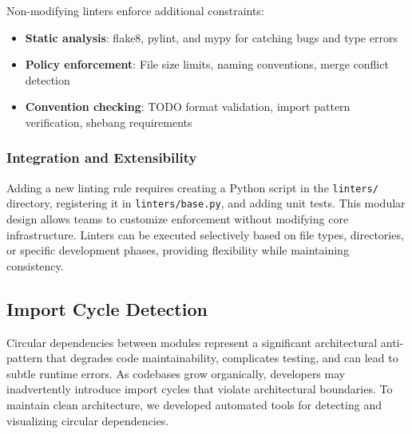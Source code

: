 Non-modifying linters enforce additional constraints:

\begin{itemize}
  \item \textbf{Static analysis}: flake8, pylint, and mypy for catching bugs
    and type errors

  \item \textbf{Policy enforcement}: File size limits, naming conventions,
    merge conflict detection

  \item \textbf{Convention checking}: TODO format validation, import
    pattern verification, shebang requirements
\end{itemize}

\subsubsection{Integration and Extensibility}
Adding a new linting rule requires creating a Python script in the
\texttt{linters/} directory, registering it in \texttt{linters/base.py}, and
adding unit tests. This modular design allows teams to customize enforcement
without modifying core infrastructure. Linters can be executed selectively
based on file types, directories, or specific development phases, providing
flexibility while maintaining consistency.

\subsection{Import Cycle Detection}
Circular dependencies between modules represent a significant
architectural anti-pattern that degrades code maintainability, complicates
testing, and can lead to subtle runtime errors. As codebases grow organically,
developers may inadvertently introduce import cycles that violate
architectural boundaries. To maintain clean architecture, we developed
automated tools for detecting and visualizing circular dependencies.

